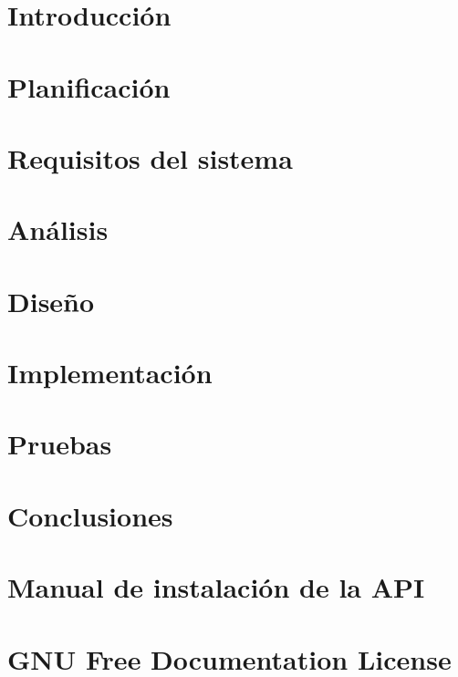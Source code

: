 \documentclass[a4paper, 12pt]{book}
\begin{document}


\tableofcontents
\listoffigures
\listoftables

\chapter{Introducción}
\label{chap:introduccion}


\chapter{Planificación}
\label{chap:calendario}


\chapter{Requisitos del sistema}
\label{chap:requisitos}


\chapter{Análisis}
\label{chap:analisis}


\chapter{Diseño}
\label{chap:diseno}


\chapter{Implementación}
\label{chap:implementacion}


\chapter{Pruebas}
\label{chap:pruebas}


\chapter{Conclusiones}
\label{chap:conclusiones}


\appendix

\chapter{Manual de instalación de la API}
\label{chap:manual_instalacion}


\chapter{GNU Free Documentation License}
\label{sec:fdl}




\end{document}
